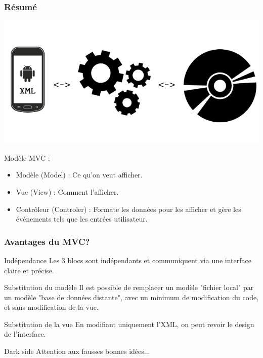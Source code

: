 \documentclass{beamer}
\begin{document}
\begin{frame}
\frametitle{Résumé}
\begin{center}
\includegraphics[scale=0.35]{MVC.png}
\end{center}
\begin{block}{Modèle MVC :}
\begin{itemize}
\item Modèle (Model) : Ce qu'on veut afficher.
\item Vue (View) : Comment l'afficher.
\item Contrôleur (Controler) : Formate les données pour les afficher et gère les événements tels que les entrées utilisateur.
\end{itemize}
\end{block}
\end{frame}


\begin{frame}
\frametitle{Avantages du MVC?}
\begin{block}{Indépendance}
Les 3 blocs sont indépendants et communiquent via une interface claire et précise.
\end{block}
\pause
\begin{block}{Substitution du modèle}
Il est possible de remplacer un modèle "fichier local" par un modèle "base de données distante", avec un minimum de modification du code, et sans modification de la vue.
\end{block}
\pause
\begin{block}{Substitution de la vue}
En modifiant uniquement l'XML, on peut revoir le design de l'interface.
\end{block}
\pause
\begin{alertblock}{Dark side}
Attention aux fausses bonnes idées...
\end{alertblock}
\end{frame}
\end{document}
